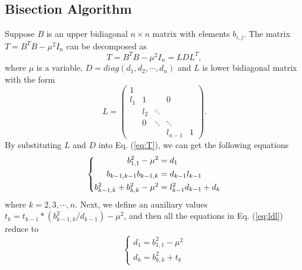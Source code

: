 \subsection{Bisection Algorithm}\label{subsec:bisection}
Suppose $B$ is an upper bidiagonal $n \times n$ matrix with elements $b_{i,j}$.
The matrix $T = B^T B - \mu^2 I_n$ can be decomposed as
\begin{equation}
T = B^T B - \mu^2 I_n = L D L^T ,
\label{eq:T}
\end{equation}
where $\mu$ is a variable, $D=diag(d_1,d_2,\cdots,d_n)$ and $L$ is lower bidiagonal matrix with the form 
\begin{equation}
 L =  \left( \begin{array}{ccccc}
     1&      &       &        &  \\
 l_{1}& 1    &       & 0      &  \\
      & l_{2}& \ddots&        &  \\
      & 0    & \ddots& \ddots &  \\
      &      &       & l_{n-1}& 1
\end{array} \right) .
\label{eq:l}
\end{equation}
By substituting $L$ and $D$ into Eq. (\ref{eq:T}), we can get the following equations
\begin{equation}
\left \{ \begin{aligned}
b_{1,1}^2 - \mu^2 &= d_1\\
b_{k-1,k-1} b_{k-1,k} &= d_{k-1} l_{k-1}\\
b_{k-1,k}^2 + b_{k,k}^2 - \mu^2 &= l_{k-1}^2 d_{k-1} + d_k
\vspace{-0.05in}
\end{aligned} \right .
\label{eq:ldl}
\end{equation}
where $k = 2,3,\cdots,n$.
Next, we define an auxiliary values $t_{k} = t_{k-1} * (b_{k-1,k}^2 / d_{k-1}) - \mu^2$, and then all the equations in Eq. (\ref{eq:ldl}) reduce to
\begin{equation}
\left \{
\begin{aligned}
d_1 = b_{1,1}^2 - \mu^2 \\
d_k = b_{k,k}^2 + t_{k}
\end{aligned}
\right .
\label{eq:negcount}
\end{equation}

